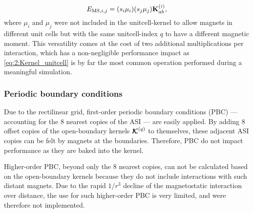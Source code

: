 
\begin{equation}
	\label{eq:2:Kernel_unitcell}
	E_{\mathrm{MS},i,j}= (s_i \mu_i) (s_j \mu_j) \vc{K}^{(i)}_{ab} \mathrm{,} %
\end{equation}
where $\mu_i$ and $\mu_j$ were not included in the unitcell-kernel to allow magnets in different unit cells but with the same unitcell-index $q$ to have a different magnetic moment.
This versatility comes at the cost of two additional multiplications per interaction, which has a non-negligible performance impact as \cref{eq:2:Kernel_unitcell} is by far the most common operation performed during a meaningful simulation. \par
\subsubsection{Periodic boundary conditions}
Due to the rectilinear grid, first-order periodic boundary conditions (PBC) --- accounting for the 8 nearest copies of the ASI --- are easily applied.
By adding 8 offset copies of the open-boundary kernels $\boldsymbol{\mathbf{\mathcal{K}}}^{(q)}$ to themselves, these adjacent ASI copies can be felt by magnets at the boundaries.
Therefore, PBC do not impact performance as they are baked into the kernel. \par
Higher-order PBC, beyond only the 8 nearest copies, can not be calculated based on the open-boundary kernels because they do not include interactions with such distant magnets.
Due to the rapid $1/r^3$ decline of the magnetostatic interaction over distance, the use for such higher-order PBC is very limited, and were therefore not implemented.
